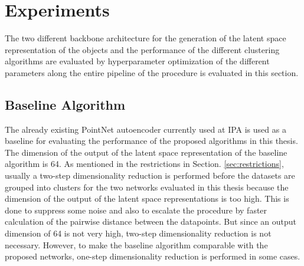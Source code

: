 \section{Experiments}
\label{sec:experiments}
The two different backbone architecture for the generation of the latent space representation of the objects and the performance of the different clustering algorithms are evaluated by hyperparameter optimization of the different parameters along the entire pipeline of the procedure is evaluated in this section.

\subsection{Baseline Algorithm}
The already existing PointNet autoencoder currently used at \ac{IPA} is used as a baseline for evaluating the performance of the proposed algorithms in this thesis. The dimension of the output of the latent space representation of the baseline algorithm is 64. As mentioned in the restrictions in Section. \ref{sec:restrictions}, usually a two-step dimensionality reduction is performed before the datasets are grouped into clusters for the two networks evaluated in this thesis because the dimension of the output of the latent space representations is too high. This is done to suppress some noise and also to escalate the procedure by faster calculation of the pairwise distance between the datapoints. But since an output dimension of 64 is not very high, two-step dimensionality reduction is not necessary. However, to make the baseline algorithm comparable with the proposed networks, one-step dimensionality reduction is performed in some cases. 

